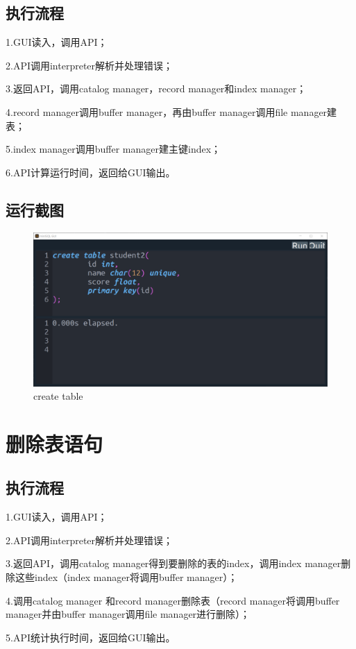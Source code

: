 \documentclass[UTF8]{ctexrep} %
\begin{document}
\subsection{执行流程}
1.GUI读入，调用API；
\par
2.API调用interpreter解析并处理错误；
\par
3.返回API，调用catalog manager，record manager和index manager；
\par
4.record manager调用buffer manager，再由buffer manager调用file manager建表；
\par
5.index manager调用buffer manager建主键index；
\par
6.API计算运行时间，返回给GUI输出。
\subsection{运行截图}
\begin{figure}[H]
    \centering
    \includegraphics[width=0.8\linewidth]{figure/1.1.png}
    \caption{create table}
    \label{fig:runtime1.1}
\end{figure}
\section{删除表语句}
\subsection{执行流程}
1.GUI读入，调用API；
\par
2.API调用interpreter解析并处理错误；
\par
3.返回API，调用catalog manager得到要删除的表的index，调用index manager删除这些index（index manager将调用buffer manager）；
\par
4.调用catalog manager 和record manager删除表（record manager将调用buffer manager并由buffer manager调用file manager进行删除）；
\par
5.API统计执行时间，返回给GUI输出。
\end{document}

